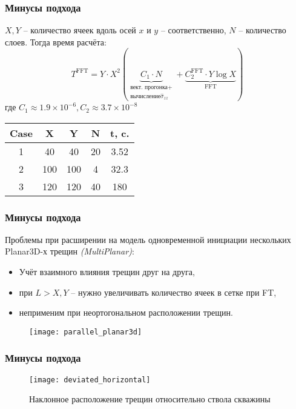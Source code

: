 \documentclass[10pt]{beamer}
\begin{document}
\begin{frame}
	\frametitle{Минусы подхода}
	$X, Y$ -- количество ячеек вдоль осей $x$ и $y$ -- соответственно, $N$ -- количество слоев. Тогда время расчёта:
	\begin{equation}
		T^\text{FFT} = Y\cdot X^2 \left( \underbrace{C_1\cdot N}_{\begin{array}{c}
		\text{вект. прогонка} + \\
		\text{вычисление} \hat{\sigma}_{zz}
		\end{array}} + \underbrace{C_2^\text{FFT}\cdot Y \log X}_{\text{FFT}}\right)
	\end{equation}
	где $\boxed{C_1 \approx 1.9 \times 10^{-6}, C_2 \approx 3.7 \times 10^{-8}}$
	
	\begin{center}
		\begin{tabular}{ |c|c|c|c|c|} 
			\hline
			Case & X & Y & N & t, c.\\ 
			\hline 
			1 & 40 & 40 & 20 & 3.52 \\ \hline
			2 & 100 & 100 & 4 & 32.3 \\ \hline
			3 & 120 & 120 & 40 & 180 \\ 
			\hline
		\end{tabular}
	\end{center}
\end{frame}


\begin{frame}
	\frametitle{Минусы подхода}
	Проблемы при расширении на модель одновременной инициации нескольких Planar3D-х трещин \textit{(MultiPlanar)}:
	\begin{itemize}
		\item Учёт взаимного влияния трещин друг на друга,
		\item при $L > X, Y$ -- нужно увеличивать количество ячеек в сетке при FT,
		\item неприменим при неортогональном расположении трещин.
	\end{itemize}
	\begin{figure}
	\texttt{[image: parallel\_planar3d]} 
	\end{figure}
\end{frame}

\begin{frame}
	\frametitle{Минусы подхода}
	\begin{figure}
		\texttt{[image: deviated\_horizontal]} 
		\caption{Наклонное расположение трещин относительно ствола скважины} 
	\end{figure}
\end{frame}
\end{document}
